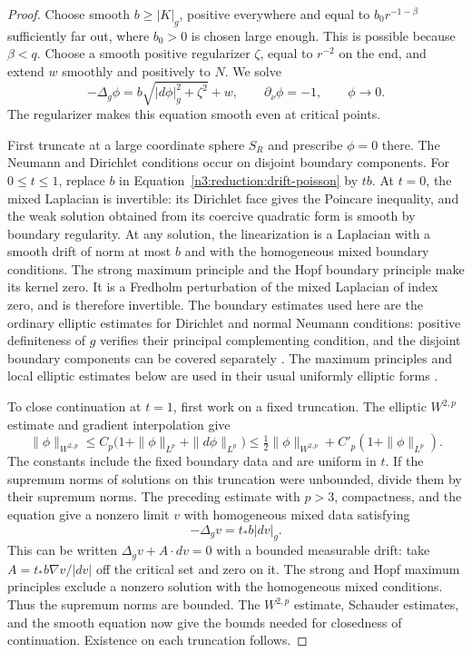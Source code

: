 \begin{proof}
Choose smooth $b\ge|K|_g$, positive everywhere and equal to
$b_0r^{-1-\beta}$ sufficiently far out, where $b_0>0$ is chosen large
enough.  This is possible because $\beta<q$.  Choose a smooth positive
regularizer $\zeta$, equal to $r^{-2}$ on the end, and extend $w$ smoothly
and positively to $N$.  We solve
\begin{equation}
 \label{n3:reduction:drift-poisson}
 -\Delta_g\phi=b\sqrt{|d\phi|_g^2+\zeta^2}+w,
 \qquad \partial_\nu\phi=-1,
 \qquad \phi\longrightarrow0.
\end{equation}
The regularizer makes this equation smooth even at critical points.

First truncate at a large coordinate sphere $S_R$ and prescribe
$\phi=0$ there.  The Neumann and Dirichlet conditions occur on disjoint
boundary components.  For $0\le t\le1$, replace $b$ in
Equation~\eqref{n3:reduction:drift-poisson} by $tb$.  At $t=0$, the mixed
Laplacian is invertible: its Dirichlet face gives the Poincare inequality,
and the weak solution obtained from its coercive quadratic form is smooth
by boundary regularity.  At any solution, the linearization is a
Laplacian with a smooth drift of norm at most $b$ and with the homogeneous
mixed boundary conditions.  The strong maximum principle and the Hopf
boundary principle make its kernel zero.  It is a Fredholm perturbation
of the mixed Laplacian of index zero, and is therefore invertible.
The boundary estimates used here are the ordinary elliptic estimates
for Dirichlet and normal Neumann conditions: positive definiteness of
$g$ verifies their principal complementing condition, and the disjoint
boundary components can be covered separately
\cite{AgmonDouglisNirenberg1959}.  The maximum principles and local
elliptic estimates below are used in their usual uniformly elliptic
forms \cite{GilbargTrudinger2001}.

To close continuation at $t=1$, first work on a fixed truncation.
The elliptic $W^{2,p}$ estimate
and gradient interpolation give
\[
 \|\phi\|_{W^{2,p}}
 \le C_p\bigl(1+\|\phi\|_{L^p}+\|d\phi\|_{L^p}\bigr)
 \le \tfrac12\|\phi\|_{W^{2,p}}
       +C'_p(1+\|\phi\|_{L^p}).
\]
The constants include the fixed boundary data and are uniform in $t$.
If the supremum norms of solutions on this truncation were unbounded,
divide them by their supremum norms.  The preceding estimate with
$p>3$, compactness, and the equation give a nonzero limit $v$ with
homogeneous mixed data satisfying
\[
 -\Delta_gv=t_*b|dv|_g.
\]
This can be written $\Delta_gv+A\cdot dv=0$ with a bounded measurable
drift: take $A=t_*b\nabla v/|dv|$ off the critical set and zero on it.
The strong and Hopf maximum principles exclude a nonzero solution with
the homogeneous mixed conditions.  Thus the supremum norms are bounded.
The $W^{2,p}$ estimate, Schauder estimates, and the smooth equation now
give the bounds needed for closedness of continuation.  Existence on
each truncation follows.


\end{proof}
